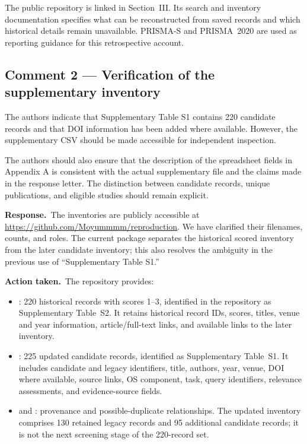 \documentclass[11pt,a4paper]{article}
\newcommand{\response}{\par\textbf{Response.}\ }
\newcommand{\action}{\par\textbf{Action taken.}\ }
\newcommand{\repo}{\url{https://github.com/Moyummmm/reproduction}}
\begin{document}
The public repository is linked in Section~III. Its search and inventory documentation specifies what can be reconstructed from saved records and which historical details remain unavailable. PRISMA-S and PRISMA~2020 are used as reporting guidance for this retrospective account.

\subsection{Comment 2 --- Verification of the supplementary inventory}
\begin{reviewcomment}
The authors indicate that Supplementary Table S1 contains 220 candidate records and that DOI information has been added where available. However, the supplementary CSV should be made accessible for independent inspection.

The authors should also ensure that the description of the spreadsheet fields in Appendix A is consistent with the actual supplementary file and the claims made in the response letter. The distinction between candidate records, unique publications, and eligible studies should remain explicit.
\end{reviewcomment}

\response The inventories are publicly accessible at \repo. We have clarified their filenames, counts, and roles. The current package separates the historical scored inventory from the later candidate inventory; this also resolves the ambiguity in the previous use of ``Supplementary Table S1.''

\action The repository provides:
\begin{itemize}
\item {}: 220 historical records with scores 1--3, identified in the repository as Supplementary Table~S2. It retains historical record IDs, scores, titles, venue and year information, article/full-text links, and available links to the later inventory.
\item {}: 225 updated candidate records, identified as Supplementary Table~S1. It includes candidate and legacy identifiers, title, authors, year, venue, DOI where available, source links, OS component, task, query identifiers, relevance assessments, and evidence-source fields.
\item {} and : provenance and possible-duplicate relationships. The updated inventory comprises 130 retained legacy records and 95 additional candidate records; it is not the next screening stage of the 220-record set.
\end{itemize}
\end{document}
